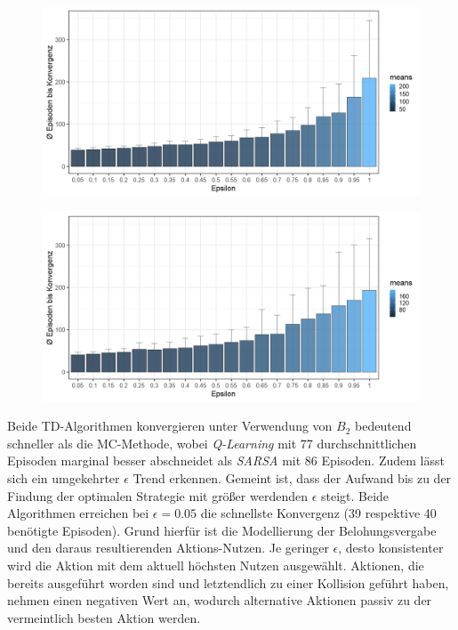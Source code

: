 \begin{figure}[H]
    \centering
    \begin{minipage}{.5\textwidth}
      \centering
      \includegraphics[width=\textwidth]{images/SimpleZ2B2QLearningA}
      \label{fig:test1}
    \end{minipage}%
    \begin{minipage}{.5\textwidth}
      \centering
      \includegraphics[width=\textwidth]{images/SimpleZ2B2SarsaA}
      \label{fig:test2}
    \end{minipage}
\end{figure}
Beide TD-Algorithmen konvergieren unter Verwendung von $B_2$ bedeutend schneller als die MC-Methode, wobei \textit{Q-Learning} mit 77 durchschnittlichen Episoden marginal besser abschneidet als \textit{SARSA} mit 86 Episoden. Zudem lässt sich ein umgekehrter $\epsilon$ Trend erkennen. Gemeint ist, dass der Aufwand bis zu der Findung der optimalen Strategie mit größer werdenden $\epsilon$ steigt. Beide Algorithmen erreichen bei $\epsilon = 0.05$ die schnellste Konvergenz (39 respektive 40 benötigte Episoden). Grund hierfür ist die Modellierung der Belohungsvergabe und den daraus resultierenden Aktions-Nutzen. Je geringer $\epsilon$, desto konsistenter wird die Aktion mit dem aktuell höchsten Nutzen ausgewählt. Aktionen, die bereits  ausgeführt worden sind und letztendlich zu einer Kollision geführt haben, nehmen einen negativen Wert an, wodurch alternative Aktionen passiv zu der vermeintlich besten Aktion werden. 
\par 

